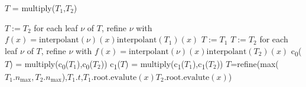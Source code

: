 \documentclass{article}
\newcommand{\nmax}{n_{\text{max}}}
\newcommand{\child}[1]{c\textsubscript{#1}}
\begin{document}
\begin{algorithm}[!h]
\caption{$T$ = multiply($T_1$,$T_2$)}
\label{multiply}
\begin{algorithmic}
\STATE $T:=T_2$
\STATE for each leaf $\nu$ of $T$, refine $\nu$ with $f(x)=\text{interpolant}(\nu)(x)\text{interpolant}(T_1)(x)$
\STATE $T:=T_1$
\STATE $T:=T_2$
\STATE for each leaf $\nu$ of $T$, refine $\nu$ with $f(x)=\text{interpolant}(\nu)(x)\text{interpolant}(T_2)(x)$
\STATE \child{0}($T$) = multiply(\child{0}($T_1$),\child{0}($T_2$))
\STATE \child{1}($T$) = multiply(\child{1}($T_1$),\child{1}($T_2$))
\ELSE
\STATE $T$=refine(max($T_1.\nmax,T_2.\nmax$),$T_1.t$,$T_1.\text{root.evalute}(x)T_2.\text{root.evalute}(x)$)
\ENDIF
\end{algorithmic}
\end{algorithm}





\end{document}
